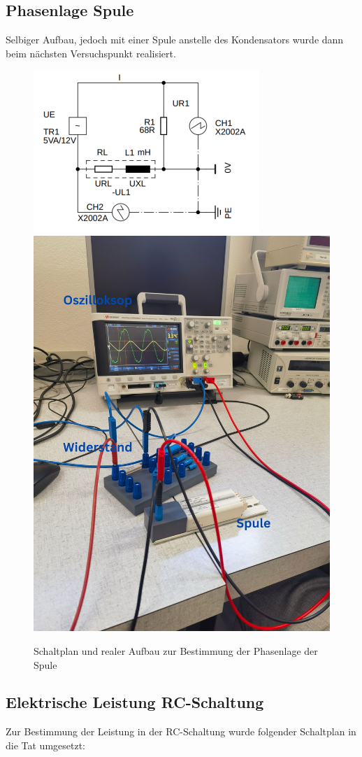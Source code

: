 \documentclass[12pt,a4paper,twoside]{article}
\begin{document}
\subsection{Phasenlage Spule}

Selbiger Aufbau, jedoch mit einer Spule anstelle des Kondensators wurde dann beim nächsten Versuchspunkt realisiert.

\begin{figure}[H]
    \centering
    \includegraphics[width=0.4\linewidth]{nudes/Schaltplan4.PNG}
    \includegraphics[width=0.4\linewidth]{nudes/PhaseLeistungBilder/Aufbau4.jpg}
    \caption{Schaltplan und realer Aufbau zur Bestimmung der Phasenlage der Spule}
    \label{fig:Aufbau4}
\end{figure}

\subsection{Elektrische Leistung RC-Schaltung}

Zur Bestimmung der Leistung in der RC-Schaltung wurde folgender Schaltplan in die Tat umgesetzt:
\end{document}
